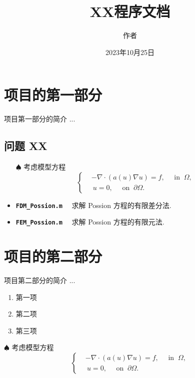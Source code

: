 \documentclass[11pt]{article}
\title{XX程序文档}
\author{作者}
\date{2023年10月25日}
\numberwithin{equation}{section}
\newcommand{\textcode}[1]{\textcolor{winered}{\bfseries\texttt{#1}}~~}
\begin{document}
\maketitle


\section{项目的第一部分}

项目第一部分的简介 ...

\subsection{问题 XX}

\begin{itemize}
\setlength{\itemsep}{3pt}
\item [$\spadesuit$] 考虑模型方程
\begin{equation}\label{eq:NLPossion4}
\left\{
\begin{aligned}
&-\nabla \cdot(a(u) \nabla u) = f,\quad \text{ in } ~\Omega, \\
&~u = 0, \quad \text{ on } ~ \partial \Omega.
\end{aligned}\right.
\end{equation}

\item \textcode{FDM\_Possion.m} 求解 Possion 方程的有限差分法.

\item \textcode{FEM\_Possion.m} 求解 Possion 方程的有限元法.
\end{itemize}


\section{项目的第二部分}

项目第二部分的简介 ...

\begin{enumerate}
\setlength{\itemsep}{3pt}
  \item 第一项
  \item 第二项
  \item 第三项
\end{enumerate}



\medskip
\noindent $\spadesuit$ 考虑模型方程
\begin{equation}\label{eq:NLPossion4}
\left\{
\begin{aligned}
&-\nabla \cdot(a(u) \nabla u) = f,\quad \text{ in } ~\Omega, \\
&~u = 0, \quad \text{ on } ~ \partial \Omega.
\end{aligned}\right.
\end{equation}
\end{document}
